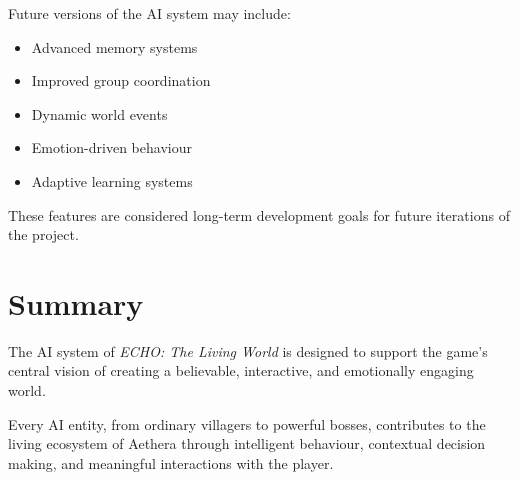 Future versions of the AI system may include:

\begin{itemize}
    \item Advanced memory systems
    \item Improved group coordination
    \item Dynamic world events
    \item Emotion-driven behaviour
    \item Adaptive learning systems
\end{itemize}

These features are considered long-term development goals for future iterations of the project.

\section{Summary}

The AI system of \textit{ECHO: The Living World} is designed to support the game's central vision of creating a believable, interactive, and emotionally engaging world.

Every AI entity, from ordinary villagers to powerful bosses, contributes to the living ecosystem of Aethera through intelligent behaviour, contextual decision making, and meaningful interactions with the player.